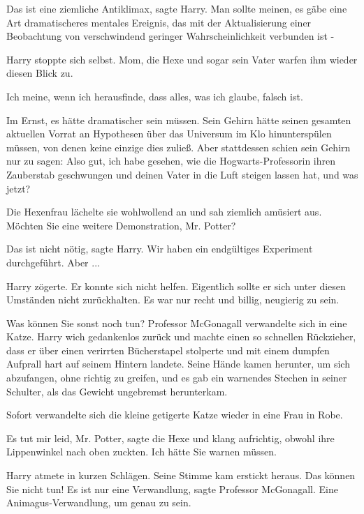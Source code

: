 \glqq{}Das ist eine ziemliche Antiklimax\grqq{}, sagte Harry. \glqq{}Man sollte
meinen, es gäbe eine Art dramatischeres mentales Ereignis, das mit der
Aktualisierung einer Beobachtung von verschwindend geringer Wahrscheinlichkeit
verbunden ist -\grqq{}

Harry stoppte sich selbst. Mom, die Hexe und sogar sein Vater warfen ihm wieder
diesen Blick zu.

\glqq{}Ich meine, wenn ich herausfinde, dass alles, was ich glaube, falsch
ist.\grqq{}

Im Ernst, es hätte dramatischer sein müssen. Sein Gehirn hätte seinen gesamten
aktuellen Vorrat an Hypothesen über das Universum im Klo hinunterspülen müssen,
von denen keine einzige dies zuließ. Aber stattdessen schien sein Gehirn nur zu
sagen: \glqq{}Also gut, ich habe gesehen, wie die Hogwarts-Professorin ihren
Zauberstab geschwungen und deinen Vater in die Luft steigen lassen hat, und was
jetzt?\grqq{}

Die Hexenfrau lächelte sie wohlwollend an und sah ziemlich amüsiert aus. \glqq{}
Möchten Sie eine weitere Demonstration, Mr. Potter?\grqq{}

\glqq{}Das ist nicht nötig\grqq{}, sagte Harry. \glqq{}Wir haben ein endgültiges
Experiment durchgeführt. Aber ...\grqq{}

Harry zögerte. Er konnte sich nicht helfen. Eigentlich sollte er sich unter
diesen Umständen nicht zurückhalten. Es war nur recht und billig, neugierig zu
sein.

\glqq{}Was können Sie sonst noch tun?\grqq{} Professor McGonagall verwandelte
sich in eine Katze. Harry wich gedankenlos zurück und machte einen so schnellen
Rückzieher, dass er über einen verirrten Bücherstapel stolperte und mit einem
dumpfen Aufprall hart auf seinem Hintern landete. Seine Hände kamen herunter, um
sich abzufangen, ohne richtig zu greifen, und es gab ein warnendes Stechen in
seiner Schulter, als das Gewicht ungebremst herunterkam.

Sofort verwandelte sich die kleine getigerte Katze wieder in eine Frau in Robe.

\glqq{}Es tut mir leid, Mr. Potter\grqq{}, sagte die Hexe und klang aufrichtig,
obwohl ihre Lippenwinkel nach oben zuckten. \glqq{}Ich hätte Sie warnen
müssen.\grqq{}

Harry atmete in kurzen Schlägen. Seine Stimme kam erstickt heraus. \glqq{}Das
können Sie nicht tun!\grqq{} \glqq{}Es ist nur eine Verwandlung\grqq{}, sagte
Professor McGonagall. \glqq{}Eine Animagus-Verwandlung, um genau zu sein.\grqq{}

